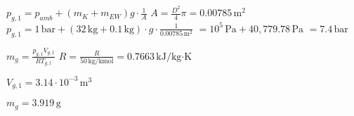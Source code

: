 \( p_{g,1} = p_{amb} + (m_K + m_{EW}) g \cdot \frac{1}{A} \)  
\( A = \frac{D^2}{4} \pi = 0.00785 \, \text{m}^2 \)  
\( p_{g,1} = 1 \, \text{bar} + (32 \, \text{kg} + 0.1 \, \text{kg}) \cdot g \cdot \frac{1}{0.00785 \, \text{m}^2} \)  
\( = 10^5 \, \text{Pa} + 40,779.78 \, \text{Pa} \)  
\( = 7.4 \, \text{bar} \)  

\( m_g = \frac{p_{g,1} V_{g,1}}{R T_{g,1}} \)  
\( R = \frac{R}{50 \, \text{kg/kmol}} = 0.7663 \, \text{kJ/kg·K} \)  

\( V_{g,1} = 3.14 \cdot 10^{-3} \, \text{m}^3 \)  

\( m_g = 3.919 \, \text{g} \)